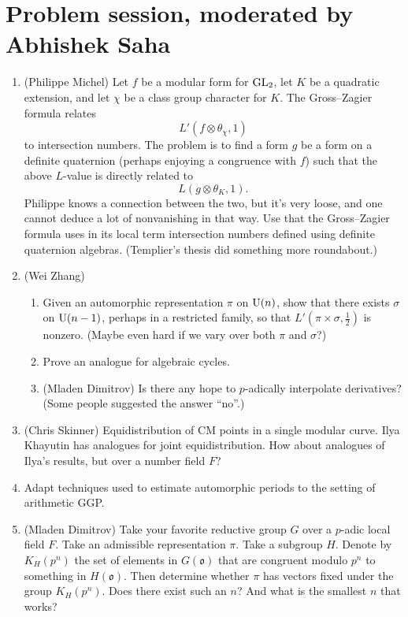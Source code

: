 \documentclass[reqno]{amsart} 
\begin{document}
\section{Problem session, moderated by Abhishek Saha}

\begin{enumerate}
\item\label{enumerate:cnej3fpbu9} (Philippe Michel) Let $f$ be a modular form for $\operatorname{GL}_2$, let $K$ be a quadratic extension, and let $\chi$ be a class group character for $K$.  The Gross--Zagier formula relates
  \begin{equation*}
    L'(f \otimes \theta_\chi, 1)
  \end{equation*}
  to intersection numbers.  The problem is to find a form $g$ be a form on a definite quaternion (perhaps enjoying a congruence with $f$) such that the above $L$-value is directly related to
  \begin{equation*}
    L(g \otimes \theta_K, 1).
  \end{equation*}
  Philippe knows a connection between the two, but it's very loose, and one cannot deduce a lot of nonvanishing in that way.  Use that the Gross--Zagier formula uses in its local term intersection numbers defined using definite quaternion algebras.  (Templier's thesis did something more roundabout.)

\item\label{enumerate:cnej3fpe3c} (Wei Zhang)
  \begin{enumerate}
  \item Given an automorphic representation $\pi$ on $\operatorname{U}(n)$, show that there exists $\sigma$ on $\operatorname{U}(n - 1)$, perhaps in a restricted family, so that $L '(\pi \times \sigma, \tfrac{1}{2})$ is nonzero.  (Maybe even hard if we vary over both $\pi$ and $\sigma$?)
  \item Prove an analogue for algebraic cycles.
  \item (Mladen Dimitrov) Is there any hope to $p$-adically interpolate derivatives?  (Some people suggested the answer ``no''.)
  \end{enumerate}
\item\label{enumerate:cnej3fpha2} (Chris Skinner) Equidistribution of CM points in a single modular curve.  Ilya Khayutin has analogues for joint equidistribution.  How about analogues of Ilya's results, but over a number field $F$?
\item\label{enumerate:cnej3fqemr} Adapt techniques used to estimate automorphic periods to the setting of arithmetic GGP.
\item\label{enumerate:cnej3fqfnd} (Mladen Dimitrov) Take your favorite reductive group $G$ over a $p$-adic local field $F$.  Take an admissible representation $\pi$.  Take a subgroup $H$.  Denote by $K_H(p^n)$ the set of elements in $G(\mathfrak{o})$ that are congruent modulo $p^n$ to something in $H(\mathfrak{o})$.  Then determine whether $\pi$ has vectors fixed under the group $K_H(p^n)$.  Does there exist such an $n$?  And what is the smallest $n$ that works?


\end{enumerate}
\end{document}
